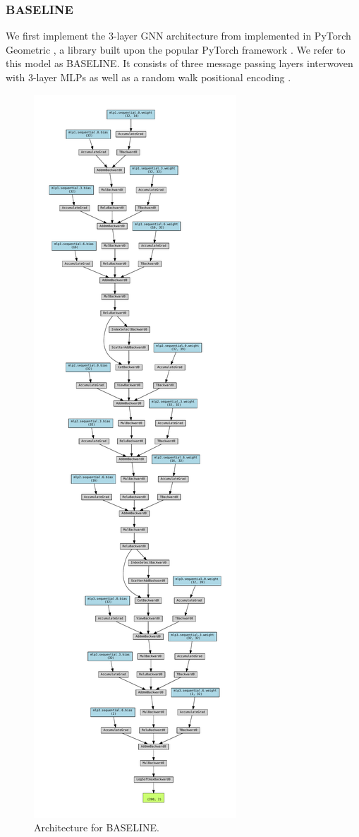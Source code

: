 \documentclass{article}
\begin{document}
\subsubsection{BASELINE}
We first implement the 3-layer GNN architecture from \citet{langedal_et_al}
implemented in PyTorch Geometric \citet{pyg},
a library built upon the popular PyTorch framework \citet{pytorch}.
We refer to this model as BASELINE.
It consists of three message passing layers
interwoven with 3-layer MLPs
as well as a random walk positional encoding \citet{dwivedi2021graph}.

\begin{figure}
     \centering
     \includegraphics[height=0.7\paperheight]{figures/baseline_arch}
     \caption{Architecture for BASELINE.}
     \label{fig:baseline_arch}
\end{figure}
\end{document}

